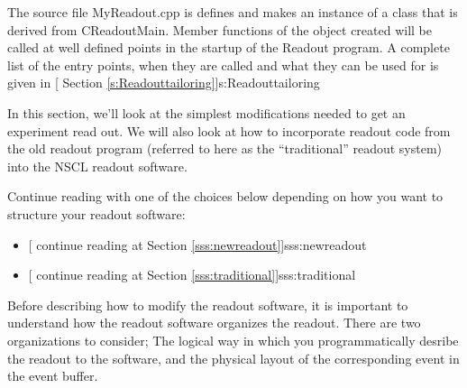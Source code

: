    
      The source file {MyReadout.cpp} is defines and
      makes an instance of a class that is derived from 
      CReadoutMain.  Member functions of the object 
      created will be called at well defined points in the
      startup of the Readout program.  A complete list of
      the entry points, when they are called and what they can
      be used for is given in [
      Section \ref{s:Readouttailoring}]{s:Readouttailoring}
      
      In this section, we'll look at the simplest modifications
      needed to get an experiment read out.  We will also look
      at how to incorporate readout code from the old readout 
      program
      (referred to here as the ``traditional'' readout system)
      into the NSCL readout software.
      
      Continue reading with one of the choices below 
      depending on how
      you want to structure your readout software:
      
      \begin{itemize}
	 \item {}[
	    continue reading at Section 
	    \ref{sss:newreadout}]{sss:newreadout}
	 \item {}[
	    continue reading at Section 
	    \ref{sss:traditional}]{sss:traditional}
      \end{itemize}
      
      \htmlmenu

      
      Before describing how to modify the readout software, it is 
      important to understand how the readout software organizes
      the readout.  There are two organizations to consider; The 
      logical way in which you programmatically desribe the 
      readout to the software, and the physical layout of the
      corresponding event in the event buffer.
      
